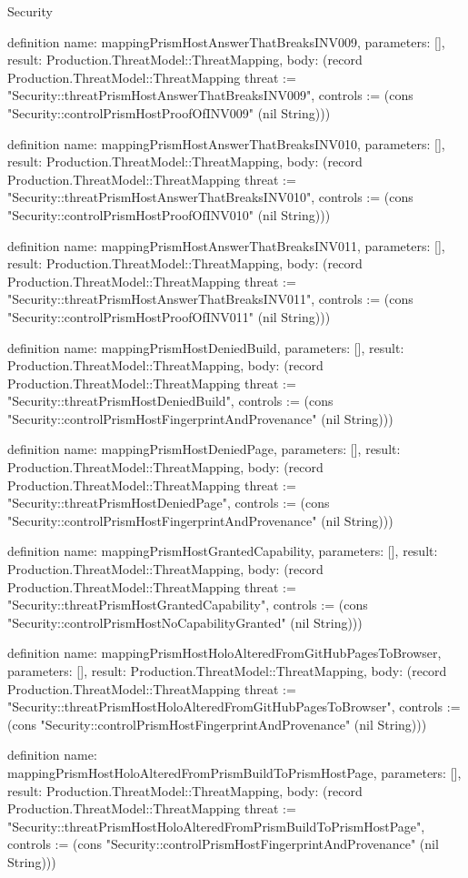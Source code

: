 \begin{lexlean}{Security}
\begin{semanticmodule}
definition{
  name: mappingPrismHostAnswerThatBreaksINV009,
  parameters: [],
  result: Production.ThreatModel::ThreatMapping,
  body: (record Production.ThreatModel::ThreatMapping {threat := "Security::threatPrismHostAnswerThatBreaksINV009", controls := (cons "Security::controlPrismHostProofOfINV009" (nil String))})
}

definition{
  name: mappingPrismHostAnswerThatBreaksINV010,
  parameters: [],
  result: Production.ThreatModel::ThreatMapping,
  body: (record Production.ThreatModel::ThreatMapping {threat := "Security::threatPrismHostAnswerThatBreaksINV010", controls := (cons "Security::controlPrismHostProofOfINV010" (nil String))})
}

definition{
  name: mappingPrismHostAnswerThatBreaksINV011,
  parameters: [],
  result: Production.ThreatModel::ThreatMapping,
  body: (record Production.ThreatModel::ThreatMapping {threat := "Security::threatPrismHostAnswerThatBreaksINV011", controls := (cons "Security::controlPrismHostProofOfINV011" (nil String))})
}

definition{
  name: mappingPrismHostDeniedBuild,
  parameters: [],
  result: Production.ThreatModel::ThreatMapping,
  body: (record Production.ThreatModel::ThreatMapping {threat := "Security::threatPrismHostDeniedBuild", controls := (cons "Security::controlPrismHostFingerprintAndProvenance" (nil String))})
}

definition{
  name: mappingPrismHostDeniedPage,
  parameters: [],
  result: Production.ThreatModel::ThreatMapping,
  body: (record Production.ThreatModel::ThreatMapping {threat := "Security::threatPrismHostDeniedPage", controls := (cons "Security::controlPrismHostFingerprintAndProvenance" (nil String))})
}

definition{
  name: mappingPrismHostGrantedCapability,
  parameters: [],
  result: Production.ThreatModel::ThreatMapping,
  body: (record Production.ThreatModel::ThreatMapping {threat := "Security::threatPrismHostGrantedCapability", controls := (cons "Security::controlPrismHostNoCapabilityGranted" (nil String))})
}

definition{
  name: mappingPrismHostHoloAlteredFromGitHubPagesToBrowser,
  parameters: [],
  result: Production.ThreatModel::ThreatMapping,
  body: (record Production.ThreatModel::ThreatMapping {threat := "Security::threatPrismHostHoloAlteredFromGitHubPagesToBrowser", controls := (cons "Security::controlPrismHostFingerprintAndProvenance" (nil String))})
}

definition{
  name: mappingPrismHostHoloAlteredFromPrismBuildToPrismHostPage,
  parameters: [],
  result: Production.ThreatModel::ThreatMapping,
  body: (record Production.ThreatModel::ThreatMapping {threat := "Security::threatPrismHostHoloAlteredFromPrismBuildToPrismHostPage", controls := (cons "Security::controlPrismHostFingerprintAndProvenance" (nil String))})
}


\end{semanticmodule}
\end{lexlean}
